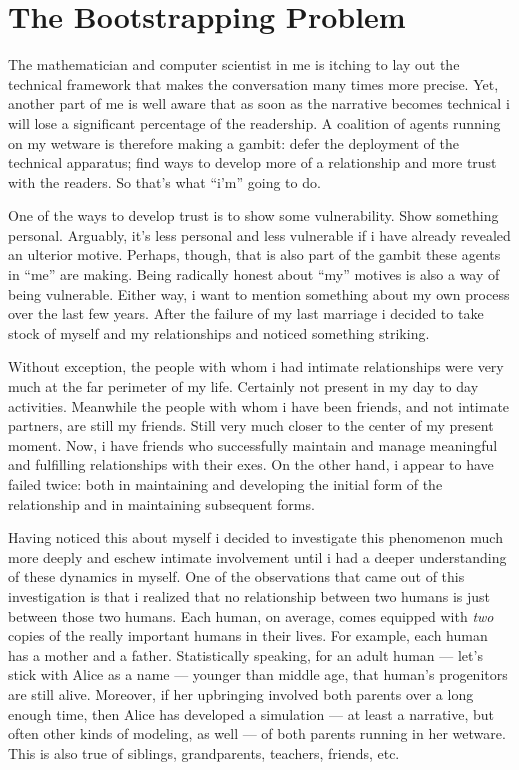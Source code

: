 \section{The Bootstrapping Problem}
\label{sec:pledge-iii}

The mathematician and computer scientist in me is itching to lay out the technical framework that makes the conversation many times more precise. Yet, another part of me is well aware that as soon as the narrative becomes technical i will lose a significant percentage of the readership. A coalition of agents running on my wetware is therefore making a gambit: defer the deployment of the technical apparatus; find ways to develop more of a relationship and more trust with the readers. So that's what ``i'm'' going to do.

One of the ways to develop trust is to show some vulnerability. Show something personal. Arguably, it's less personal and less vulnerable if i have already revealed an ulterior motive. Perhaps, though, that is also part of the gambit these agents in ``me'' are making. Being radically honest about ``my'' motives is also a way of being vulnerable. Either way, i want to mention something about my own process over the last few years. After the failure of my last marriage i decided to take stock of myself and my relationships and noticed something striking. 

Without exception, the people with whom i had intimate relationships were very much at the far perimeter of my life. Certainly not present in my day to day activities. Meanwhile the people with whom i have been friends, and not intimate partners, are still my friends. Still very much closer to the center of my present moment. Now, i have friends who successfully maintain and manage meaningful and fulfilling relationships with their exes. On the other hand, i appear to have failed twice: both in maintaining and developing the initial form of the relationship and in maintaining subsequent forms.

Having noticed this about myself i decided to investigate this phenomenon much more deeply and eschew intimate involvement until i had a deeper understanding of these dynamics in myself. One of the observations that came out of this investigation is that i realized that no relationship between two humans is just between those two humans. Each human, on average, comes equipped with \emph{two} copies of the really important humans in their lives. For example, each human has a mother and a father. Statistically speaking, for an adult human --- let's stick with Alice as a name --- younger than middle age, that human's progenitors are still alive. Moreover, if her upbringing involved both parents over a long enough time, then Alice has developed a simulation --- at least a narrative, but often other kinds of modeling, as well --- of both parents running in her wetware. This is also true of siblings, grandparents, teachers, friends, etc.

